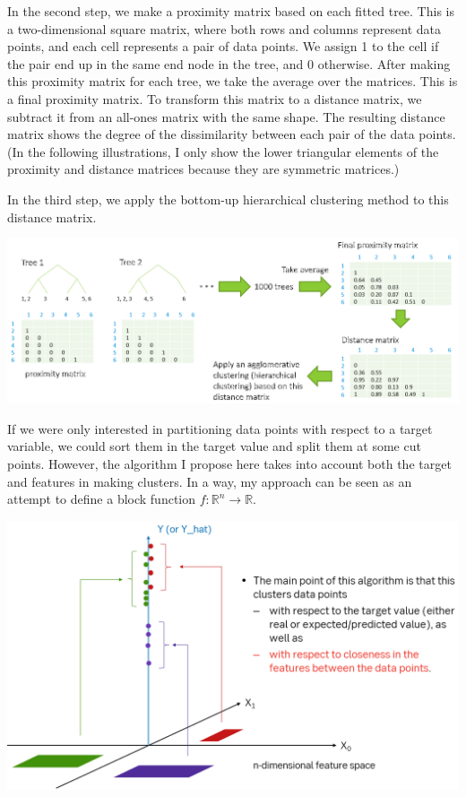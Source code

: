 \documentclass{article}
\begin{document}
In the second step, we make a proximity matrix based on each fitted tree. This is a two-dimensional square matrix, where both rows and columns represent data points, and each cell represents a pair of data points. We assign 1 to the cell if the pair end up in the same end node in the tree, and 0 otherwise. After making this proximity matrix for each tree, we take the average over the matrices. This is a final proximity matrix. To transform this matrix to a distance matrix, we subtract it from an all-ones matrix with the same shape. The resulting distance matrix shows the degree of the dissimilarity between each pair of the data points. (In the following illustrations, I only show the lower triangular elements of the proximity and distance matrices because they are symmetric matrices.)

In the third step, we apply the bottom-up hierarchical clustering method to this distance matrix.

\includegraphics[width=1\textwidth]{supervised_clustering}

If we were only interested in partitioning data points with respect to a target variable, we could sort them in the target value and split them at some cut points. However, the algorithm I propose here takes into account both the target and features in making clusters. In a way, my approach can be seen as an attempt to define a block function $f:\mathbb{R}^n\rightarrow\mathbb{R}$.

\includegraphics[width=1\textwidth]{block_function}
\end{document}
